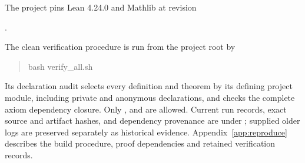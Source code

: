 The project pins Lean 4.24.0 and Mathlib at revision
\begin{center}.\end{center}
The clean verification procedure is run from the project root by
\begin{quote}\ttfamily\small
bash verify\_all.sh
\end{quote}
Its declaration audit selects every definition and theorem by its defining
project module, including private and anonymous declarations, and checks
the complete axiom dependency closure. Only ,
 and  are allowed. Current run
records, exact source and artifact hashes, and dependency provenance are
under ; supplied older logs are preserved
separately as historical evidence. Appendix~\ref{app:reproduce} describes
the build procedure, proof dependencies and retained verification records.
